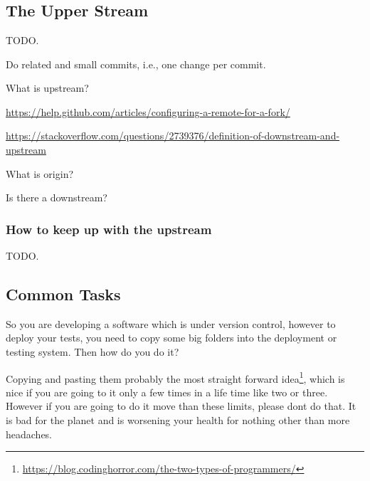 

%


\chapter{}


    \section{The Upper Stream}

    TODO.

    Do related and small commits, i.e., one change per commit.

    What is upstream?

    \url{https://help.github.com/articles/configuring-a-remote-for-a-fork/}

    \url{https://stackoverflow.com/questions/2739376/definition-of-downstream-and-upstream}

    What is origin?

    Is there a downstream?



    \subsection{How to keep up with the upstream}

    TODO.



    \section{Common Tasks}

    So you are developing a software which is under version control, however to
    deploy your tests, you need to copy some big folders into the deployment or
    testing system. Then how do you do it?

    Copying and pasting them probably the most straight forward
    idea\footnote{\url{https://blog.codinghorror.com/the-two-types-of-programmers/}},
    which is
    nice if you are going to it only a few times in a life time like two or
    three. However if you are going to do it move than these limits,
    please don\q t do that. It is bad for the planet and is worsening your
    health for nothing other than more headaches.

